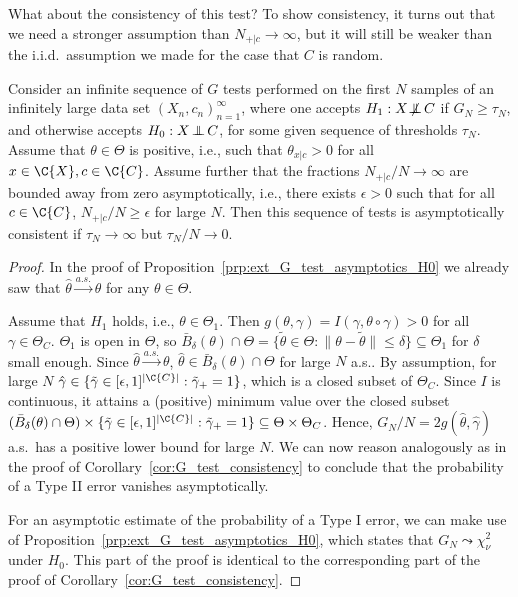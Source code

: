 What about the consistency of this test? To show consistency, it turns out that we need a stronger assumption
than $N_{+|c} \to \infty$, but it will still be weaker than the i.i.d.\ assumption we made for the case that $C$ is random.
\begin{Cor}\label{cor:ext_G_test_consistency}
Consider an infinite sequence of $G$ tests performed on the first $N$ samples of an infinitely large
data set $(X_n,c_n)_{n=1}^\infty$,
where one accepts $H_1 : X \operatorname*{\not\mkern-2mu\perp\mkern-11mu\perp} C$ if $G_N \ge \tau_N$, and otherwise accepts $H_0 : X \operatorname*{\perp\mkern-11mu\perp} C$, 
for some given sequence of thresholds $\tau_N$.
Assume that $\theta \in \Theta$ is positive, i.e., such that $\theta_{x|c} > 0$ for all $x \in \C{X}, c \in \C{C}$.
Assume further that the fractions $N_{+|c} / N \to \infty$ are bounded away from zero asymptotically,
i.e., there exists $\epsilon > 0$ such that for all $c \in \C{C}$, $N_{+|c} / N \ge \epsilon$ for large $N$.
Then this sequence of tests is asymptotically consistent if $\tau_N \to \infty$ but $\tau_N / N \to 0$.
\end{Cor}
\begin{proof}
In the proof of Proposition~\ref{prp:ext_G_test_asymptotics_H0}
we already saw that $\hat\theta \stackrel{a.s.}{\to} \theta$ for any $\theta \in \Theta$.

Assume that $H_1$ holds, i.e., $\theta \in \Theta_1$.
Then $g(\theta,\gamma) = I(\gamma, \theta \circ \gamma) > 0$ for all $\gamma \in \Theta_C$.
$\Theta_1$ is open in $\Theta$, so $\bar B_{\delta}(\theta) \cap \Theta = \{\tilde{\theta} \in \Theta : \lVert \theta - \tilde{\theta} \rVert \le \delta \} \subseteq \Theta_1$ for $\delta$ small enough.
Since $\hat\theta \stackrel{a.s.}{\to} \theta$, $\hat\theta \in \bar B_{\delta}(\theta) \cap \Theta$ for large $N$ a.s..
By assumption, for large $N$ $\hat\gamma \in \{\tilde{\gamma} \in [\epsilon,1]^{|\C{C}|} : \tilde{\gamma}_+ = 1\}$,
which is a closed subset of $\Theta_C$.
Since $I$ is continuous, it attains a (positive) minimum value over the closed subset
$(\bar B_{\delta}(\theta) \cap \Theta) \times \{\tilde{\gamma} \in [\epsilon,1]^{|\C{C}|} : \tilde{\gamma}_+ = 1\} \subseteq \Theta \times \Theta_C$.
Hence, $G_N / N = 2g(\hat\theta,\hat\gamma)$ a.s.\ has a positive lower bound for large $N$.
We can now reason analogously as in the proof of Corollary~\ref{cor:G_test_consistency} to conclude that
the probability of a Type II error vanishes asymptotically.

For an asymptotic estimate of the probability of a Type I error,
we can make use of Proposition~\ref{prp:ext_G_test_asymptotics_H0},
which states that $G_N \leadsto \chi_{\nu}^2$ under $H_0$. 
This part of the proof is identical to the corresponding part of the proof of Corollary~\ref{cor:G_test_consistency}.
\end{proof}
